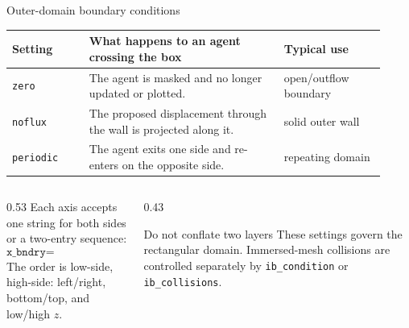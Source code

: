 \documentclass[aspectratio=169,11pt]{beamer}
\begin{document}
\begin{frame}{Outer-domain boundary conditions}
\small
\begin{tabular}{@{}p{0.19\linewidth}p{0.48\linewidth}p{0.25\linewidth}@{}}
\toprule
\textbf{Setting} & \textbf{What happens to an agent crossing the box} & \textbf{Typical use} \\
\midrule
\texttt{zero} & The agent is masked and no longer updated or plotted. & open/outflow boundary \\
\texttt{noflux} & The proposed displacement through the wall is projected along it. & solid outer wall \\
\texttt{periodic} & The agent exits one side and re-enters on the opposite side. & repeating domain \\
\bottomrule
\end{tabular}

\vspace{0.6em}
\begin{columns}[T,onlytextwidth]
\begin{column}{0.53\textwidth}
Each axis accepts one string for both sides or a two-entry sequence:
\[
  \texttt{x\_bndry=["zero","noflux"]}.
\]
The order is low-side, high-side: left/right, bottom/top, and low/high \(z\).
\end{column}
\begin{column}{0.43\textwidth}
\begin{alertblock}{Do not conflate two layers}
These settings govern the rectangular domain. Immersed-mesh collisions are controlled separately by \texttt{ib\_condition} or \texttt{ib\_collisions}.
\end{alertblock}
\end{column}
\end{columns}
\end{frame}
\end{document}
